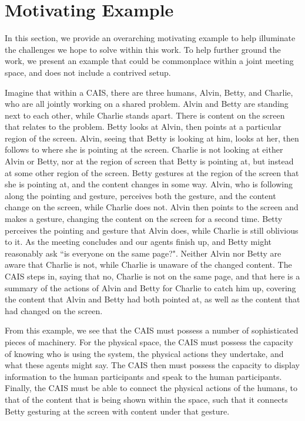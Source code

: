 \section{Motivating Example}

In this section, we provide an overarching motivating example to help
illuminate the challenges we hope to solve within this work. To help further
ground the work, we present an example that could be commonplace within a joint
meeting space, and does not include a contrived setup.

Imagine that within a CAIS, there are three humans, Alvin, Betty, and Charlie,
who are all jointly working on a shared problem. Alvin and Betty are standing
next to each other, while Charlie stands apart. There is content on the screen
that relates to the problem. Betty looks at Alvin, then points at a particular
region of the screen. Alvin, seeing that Betty is looking at him, looks at her,
then follows to where she is pointing at the screen. Charlie is not looking at
either Alvin or Betty, nor at the region of screen that Betty is pointing at,
but instead at some other region of the screen. Betty gestures at the region of
the screen that she is pointing at, and the content changes in some way. Alvin,
who is following along the pointing and gesture, perceives both the gesture, and
the content change on the screen, while Charlie does not. Alvin then points to
the screen and makes a gesture, changing the content on the screen for a second
time. Betty perceives the pointing and gesture that Alvin does, while Charlie is
still oblivious to it. As the meeting concludes and our agents finish up, and Betty
might
reasonably ask ``is everyone on the same page?". Neither Alvin nor
Betty are aware that Charlie is not, while Charlie is unaware of the
changed content. The CAIS steps in, saying that no, Charlie is not on
the same page, and that here is a summary of the actions of Alvin and
Betty for Charlie to catch him up, covering the content that Alvin and
Betty had both pointed at, as well as the content that had changed on
the screen.

From this example, we see that the CAIS must possess a number of
sophisticated pieces of machinery. For the physical space, the CAIS
must possess the capacity of knowing who is using the system, the
physical actions they undertake, and what these agents might say. The
CAIS then must possess the capacity to display information to the
human participants and speak to the human participants. Finally, the
CAIS must be able to connect the physical actions of the humans, to
that of the content that is being shown within the space, such that it
connects Betty gesturing at the screen with content under that
gesture.
